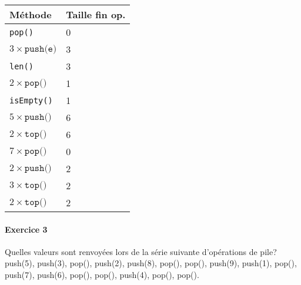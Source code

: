\documentclass{report}
\begin{document}
\begin{multicols*}{3}
\begin{table}[H]
    \begin{center}
      \renewcommand{\arraystretch}{1.5}
      \selectfont
      \footnotesize
          \begin{tabular}{|l|l|}
          \arrayrulecolor{blue}\hline
          \rowcolor{lightBlue}
          \textcolor{myb}{Méthode} & 
          \textcolor{myb}{Taille fin op.}  
          \\
          \hline
          \arrayrulecolor{black}
          \texttt{pop()} & 0
          \\
          \hline
          $3 \times \texttt{push(e)}$  & 3 
          \\
          \hline
          \texttt{len()} & 3  
          \\ 
          \hline 
          $2 \times \texttt{pop()}$ & 1  
          \\ 
          \hline 
          \texttt{isEmpty()} & 1  
          \\ 
          \hline 
          $ 5 \times \texttt{push()}$ & 6  
          \\ 
          \hline 
          $2 \times \texttt{top()}$  & 6  
          \\ 
          \hline 
          $7 \times \texttt{pop()}$  & 0  
          \\ 
          \hline 
          $2 \times \texttt{push()}$  & 2  
          \\ 
          \hline 
          $3 \times \texttt{top()}$  & 2  
          \\ 
          \hline 
          $2 \times \texttt{top()}$  & 2 
          \\ 
          \hline 
              \end{tabular}
  \end{center}
  \end{table}

  \paragraph{Exercice 3 }
  Quelles valeurs sont renvoyées lors de la série suivante d'opérations 
  de pile? push(5), push(3), pop(), push(2), push(8), pop(), pop(), 
  push(9), push(1), pop(), push(7), push(6), pop(), pop(), push(4), 
  pop(), pop().


  \paragraph{} 

  \begin{table}[H]
    \caption {}


\end{table}
\end{multicols*}
\end{document}
